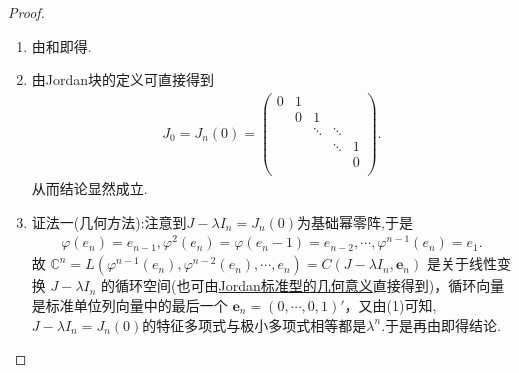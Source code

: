 \documentclass[../../main.tex]{subfiles}
\begin{document}
\begin{proof}
\begin{enumerate}[(1)]
\item 由和即得.

\item 由Jordan块的定义可直接得到
\begin{align*}
J_0=J_n(0)=\left( \begin{matrix}
0&		1&		&		&		\\
&		0&		1&		&		\\
&		&		\ddots&		\ddots&		\\
&		&		&		\ddots&		1\\
&		&		&		&		0\\
\end{matrix} \right) .
\end{align*}
从而结论显然成立.

\item {\color{blue}证法一(几何方法):}注意到$J-\lambda I_n=J_n(0)$为基础幂零阵,于是
\begin{align*}
\varphi(e_n)=e_{n-1},\varphi^2(e_n)=\varphi(e_n-1)=e_{n-2},\cdots,\varphi^{n-1}(e_n)=e_1.
\end{align*}
故
$\mathbb{C}^n =L(\varphi^{n-1}(e_n),\varphi^{n-2}(e_n),\cdots,e_n)=C(J - \lambda I_n, \boldsymbol{e}_n)$ 是关于线性变换 $J - \lambda I_n$ 的循环空间(也可由\hyperref[theorem:Jordan标准型的几何意义]{Jordan标准型的几何意义}直接得到)，循环向量是标准单位列向量中的最后一个 $\boldsymbol{e}_n = (0, \cdots, 0, 1)'$，又由(1)可知,$J-\lambda I_n=J_n(0)$的特征多项式与极小多项式相等都是$\lambda^n$.于是再由即得结论.


\end{enumerate}
\end{proof}
\end{document}
